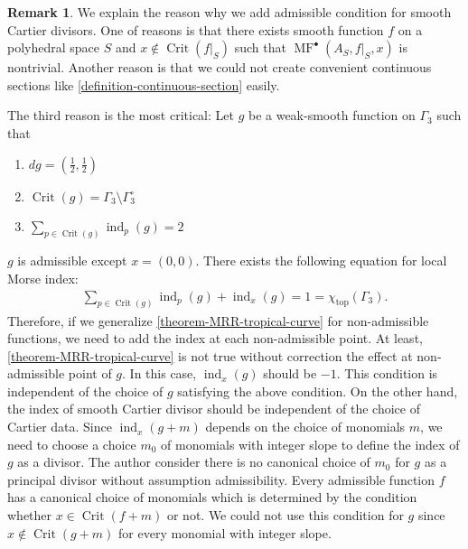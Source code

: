 \documentclass[a4paper,dvipdfmx,reqno,12pt]{amsart}
\theoremstyle{definition}
\newtheorem{remark}[theorem]{Remark}
\newcommand{\opn}[1]{\operatorname{#1}}
\numberwithin{equation}{section}
\begin{document}
\begin{remark}
\label{remark-non-admissible-divisor}
We explain the reason why we add admissible condition for 
smooth Cartier divisors. 
One of reasons is that there exists smooth function $f$
on a polyhedral space $S$ and 
$x\notin\opn{Crit}(f|_S)$ such that
$\opn{MF}^{\bullet}(A_S,f|_{S},x)$ is nontrivial.
Another reason is that we could not create 
convenient continuous sections like 
\cref{definition-continuous-section} easily.

The third reason is the most critical:
Let 
$g$ be a weak-smooth function on 
$\Gamma_3$
such that 
\begin{enumerate}
\item $dg=(\frac{1}{2},\frac{1}{2})$
\item $\opn{Crit}(g)=\Gamma_3\setminus \Gamma_3^{\circ}$
\item $\sum_{p\in \opn{Crit}(g)}\opn{ind}_p(g)=2$
\end{enumerate}
$g$ is admissible except $x=(0,0)$.
There exists the following equation for local Morse index:
\begin{align}
\sum_{p\in \opn{Crit}(g)}\opn{ind}_p(g)+
\opn{ind}_x(g)=1=\chi_{\opn{top}}(\Gamma_3).
\end{align}
Therefore, if we generalize 
\cref{theorem-MRR-tropical-curve} for non-admissible
functions, we need to add the index at each non-admissible 
point. At least, \cref{theorem-MRR-tropical-curve} is not
true without correction the effect at non-admissible point
of $g$.
In this case, $\opn{ind}_x(g)$ should be $-1$.
This condition is independent of the choice
of $g$ satisfying the above condition.
On the other hand, the index of smooth Cartier
divisor should be independent of the choice of
Cartier data.
Since $\opn{ind}_x(g+m)$ depends on the choice
of monomials $m$, we need to choose a choice $m_0$
of monomials with integer slope to 
define the index of $g$ as a divisor.
The author consider there is no canonical choice
of $m_0$ for $g$ as a principal divisor without
assumption admissibility.
Every admissible function $f$ has a canonical choice
of monomials which is determined by the condition 
whether $x\in \opn{Crit}(f+m)$ or not.
We could not use this condition for $g$ since 
$x\notin \opn{Crit}(g+m)$ for every monomial with
integer slope.
\end{remark}

\end{document}
